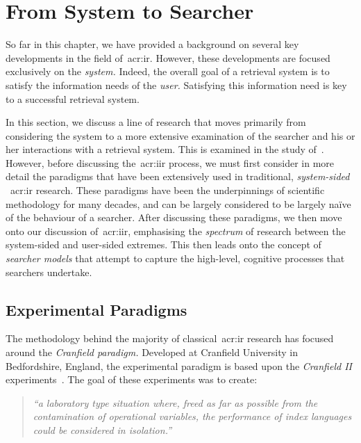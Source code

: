 \section{From System to Searcher}\label{sec:ir_background:user}
So far in this chapter, we have provided a background on several key developments in the field of~\gls{acr:ir}. However, these developments are focused exclusively on the \emph{system.} Indeed, the overall goal of a retrieval system is to satisfy the information needs of the \emph{user.} Satisfying this information need is key to a successful retrieval system.

In this section, we discuss a line of research that moves primarily from considering the system to a more extensive examination of the searcher and his or her interactions with a retrieval system. This is examined in the study of~. However, before discussing the~\gls{acr:iir} process, we must first consider in more detail the paradigms that have been extensively used in traditional, \emph{system-sided} ~\gls{acr:ir} research. These paradigms have been the underpinnings of scientific methodology for many decades, and can be largely considered to be largely na\"{i}ve of the behaviour of a searcher. After discussing these paradigms, we then move onto our discussion of~\gls{acr:iir}, emphasising the \emph{spectrum} of research between the system-sided and user-sided extremes. This then leads onto the concept of \emph{searcher models} that attempt to capture the high-level, cognitive processes that searchers undertake.

%
%
%

\subsection{Experimental Paradigms}\label{sec:ir_background:paradigms}
The methodology behind the majority of classical~\gls{acr:ir} research has focused around the \emph{Cranfield paradigm.} Developed at Cranfield University in Bedfordshire, England, the experimental paradigm is based upon the \emph{Cranfield II} experiments~\citep{aslib1966factors}. The goal of these experiments was to create:

\begin{quote}
\emph{``a laboratory type situation where, freed as far as possible from the contamination of operational variables, the performance of index languages could be considered in isolation.''}
\end{quote}

